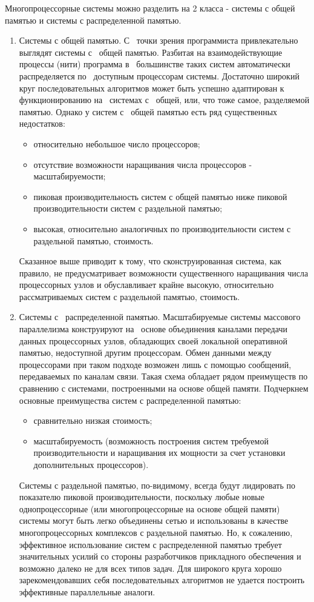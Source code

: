 Многопроцессорные системы можно разделить на 2 класса - системы с общей памятью
и системы с распределенной памятью.
\begin{enumerate}
\item  Системы с общей памятью. С~ точки зрения программиста привлекательно
выглядят системы с~ общей памятью.
Разбитая на взаимодействующие процессы (нити) программа в~ большинстве таких
систем автоматически распределяется по~ доступным процессорам системы. Достаточно
широкий круг последовательных алгоритмов может быть успешно адаптирован к~
функционированию на~ системах с~ общей, или, что тоже самое, разделяемой памятью.
Однако у систем с~ общей памятью есть ряд существенных недостатков:
\begin{itemize}
\item относительно небольшое число процессоров;
\item отсутствие возможности наращивания числа процессоров - масштабируемости;
\item пиковая производительность систем с общей памятью ниже пиковой
производительности систем с раздельной памятью;
\item высокая, относительно аналогичных по производительности систем с
раздельной памятью, стоимость.
\end{itemize}
Сказанное выше приводит к тому, что сконструированная система, как правило, не
предусматривает возможности существенного наращивания числа процессорных узлов и
обуславливает крайне высокую, относительно рассматриваемых систем с раздельной
памятью, стоимость.
 
\item Системы с~ распределенной памятью. Масштабируемые системы массового параллелизма
конструируют на~ основе объединения каналами передачи данных процессорных узлов,
обладающих своей локальной оперативной памятью, недоступной другим процессорам. Обмен данными
между процессорами при таком подходе возможен лишь с помощью сообщений,
передаваемых по каналам связи. Такая схема обладает рядом преимуществ по
сравнению с системами, построенными на основе общей памяти. Подчеркнем основные
преимущества систем с распределенной памятью:
\begin{itemize}
\item сравнительно низкая стоимость;
\item масштабируемость (возможность построения систем требуемой
производительности и наращивания их мощности за счет установки дополнительных
процессоров).
\end{itemize}
Системы с раздельной памятью, по-видимому, всегда будут лидировать по показателю
пиковой производительности, поскольку любые новые однопроцессорные (или
многопроцессорные на основе общей памяти) системы могут быть легко объединены
сетью и использованы в качестве многопроцессорных комплексов с раздельной
памятью.
Но, к сожалению, эффективное использование систем с распределенной памятью
требует значительных усилий со стороны разработчиков прикладного обеспечения и
возможно далеко не для всех типов задач. Для широкого круга хорошо
зарекомендовавших себя последовательных алгоритмов не удается построить
эффективные параллельные аналоги.
\end{enumerate}

